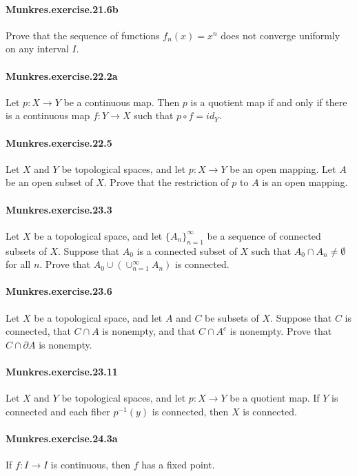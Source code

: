 \documentclass{article}
\begin{document}
\paragraph{Munkres.exercise.21.6b} Prove that the sequence of functions $f_n(x)=x^n$ does not converge uniformly on any interval $I$.

\paragraph{Munkres.exercise.22.2a} Let $p:X\to Y$ be a continuous map. Then $p$ is a quotient map if and only if there is a continuous map $f:Y\to X$ such that $p\circ f = id_Y$.

\paragraph{Munkres.exercise.22.5} Let $X$ and $Y$ be topological spaces, and let $p:X\to Y$ be an open mapping. Let $A$ be an open subset of $X$. Prove that the restriction of $p$ to $A$ is an open mapping.

\paragraph{Munkres.exercise.23.3} Let $X$ be a topological space, and let $\{A_n\}_{n=1}^\infty$ be a sequence of connected subsets of $X$. Suppose that $A_0$ is a connected subset of $X$ such that $A_0\cap A_n\neq \emptyset$ for all $n$. Prove that $A_0\cup (\cup_{n=1}^\infty A_n)$ is connected.

\paragraph{Munkres.exercise.23.6} Let $X$ be a topological space, and let $A$ and $C$ be subsets of $X$. Suppose that $C$ is connected, that $C\cap A$ is nonempty, and that $C\cap A^c$ is nonempty. Prove that $C\cap\partial A$ is nonempty.

\paragraph{Munkres.exercise.23.11} Let $X$ and $Y$ be topological spaces, and let $p:X\to Y$ be a quotient map. If $Y$ is connected and each fiber $p^{-1}(y)$ is connected, then $X$ is connected.

\paragraph{Munkres.exercise.24.3a} If $f:I\to I$ is continuous, then $f$ has a fixed point.
\end{document}
